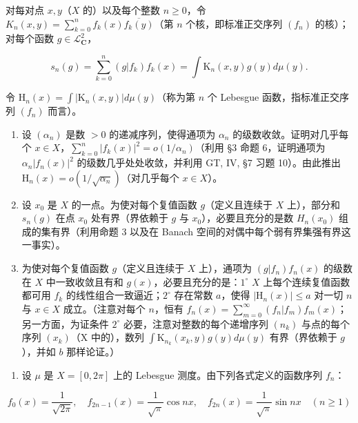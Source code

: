 对每对点 \(x, y\)（\(X\) 的）以及每个整数 \(n \geqslant 0\)，令 \(K_n(x, y) = \sum_{k=0}^{n} f_k(x) \overline{f_k(y)}\)（第 \(n\) 个核，即标准正交序列 \((f_n)\) 的核）；对每个函数 \(g \in \mathcal{L}_{\mathbf{C}}^2\)，

\[
s _ {n} (g) = \sum_ {k = 0} ^ {n} (g | f _ {k}) f _ {k} (x) = \int \mathrm{K} _ {n} (x, y) g (y) d \mu (y).
\]

令 \(\mathrm{H}_n(x) = \int |\mathrm{K}_n(x,y)|d\mu (y)\)（称为第 \(n\) 个 Lebesgue 函数，指标准正交序列 \((f_n)\) 而言）。

\begin{enumerate}
\def\labelenumi{\alph{enumi})}
\item
  设 \((\alpha_{n})\) 是数 \(>0\) 的递减序列，使得通项为 \(\alpha_{n}\) 的级数收敛。证明对几乎每个 \(x \in X\)，\(\sum_{k=0}^{n} |f_{k}(x)|^{2} = o(1/\alpha_{n})\)（利用 §3 命题 6，证明通项为 \(\alpha_{n}|f_{n}(x)|^{2}\) 的级数几乎处处收敛，并利用 GT, IV, §7 习题 10）。由此推出 \(\mathrm{H}_{n}(x) = o(1/\sqrt{\alpha_{n}})\)（对几乎每个 \(x \in X\)）。
\item
  设 \(x_0\) 是 \(X\) 的一点。为使对每个复值函数 \(g\)（定义且连续于 \(X\) 上），部分和 \(s_n(g)\) 在点 \(x_0\) 处有界（界依赖于 \(g\) 与 \(x_0\)），必要且充分的是数 \(H_n(x_0)\) 组成的集有界（利用命题 3 以及在 Banach 空间的对偶中每个弱有界集强有界这一事实）。
\item
  为使对每个复值函数 \(g\)（定义且连续于 \(X\) 上），通项为 \((g|f_n)f_n(x)\) 的级数在 \(X\) 中一致收敛且有和 \(g(x)\)，必要且充分的是：\(1^\circ\) \(X\) 上每个连续复值函数都可用 \(f_k\) 的线性组合一致逼近；\(2^\circ\) 存在常数 \(a\)，使得 \(|\mathrm{H}_n(x)| \leqslant a\) 对一切 \(n\) 与 \(x \in X\) 成立。（注意对每个 \(n\)，恒有 \(f_n(x) = \sum_{m=0}^{\infty}(f_n|f_m)f_m(x)\)；另一方面，为证条件 \(2^{\circ}\) 必要，注意对整数的每个递增序列 \((n_{k})\) 与点的每个序列 \((x_{k})\)（X 中的），数列 \(\int \mathrm{K}_{n_k}(x_k,y)g(y)d\mu (y)\) 有界（界依赖于 \(g\)），并如 \(b\) 那样论证。）
\end{enumerate}

\begin{enumerate}
\def\labelenumi{\arabic{enumi})}
\setcounter{enumi}{15}
\tightlist
\item
  设 \(\mu\) 是 \(X = [0, 2\pi]\) 上的 Lebesgue 测度。由下列各式定义的函数序列 \(f_n\)：
\end{enumerate}

\[
f _ {0} (x) = \frac {1}{\sqrt {2 \pi}}, \quad f _ {2 n - 1} (x) = \frac {1}{\sqrt {\pi}} \cos n x, \quad f _ {2 n} (x) = \frac {1}{\sqrt {\pi}} \sin n x \quad (n \geqslant 1)
\]

